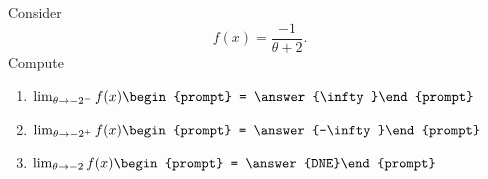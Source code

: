 \documentclass{ximera}
\author{Bart Snapp}
\begin{document}
\begin{exercise}
Consider 
\[
f(x) = \frac{-1}{\theta +2}.
\]
Compute
\begin{enumerate}
\item $\lim_{\theta\to -2^- } f(x) \begin{prompt} = \answer{\infty}\end{prompt}$
\item $\lim_{\theta\to -2^+ } f(x) \begin{prompt} = \answer{-\infty}\end{prompt}$
\item $\lim_{\theta\to -2 } f(x) \begin{prompt} = \answer{DNE}\end{prompt}$
\end{enumerate}
\end{exercise}
\end{document}
